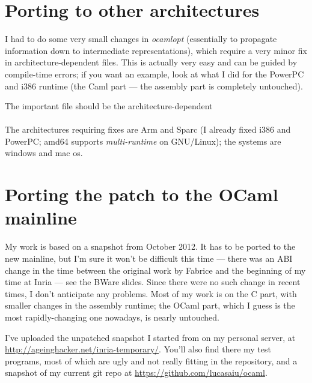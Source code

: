 \documentclass[a4paper,twoside,12pt]{article}
\newcommand{\MULTIRUNTIME}[0]{\textit{multi-runtime}\xspace}
\begin{document}
\section{Porting to other architectures}
\label{other-architectures}
I had to do some very small changes in \textit{ocamlopt} (essentially
to propagate information down to intermediate representations), which
require a very minor fix in architecture-dependent files.  This is
actually very easy and can be guided by compile-time errors; if you
want an example, look at what I did for the PowerPC and i386 runtime
(the Caml part --- the assembly part is completely untouched).

The important file should be the architecture-dependent 
\\
\\
The architectures requiring fixes are Arm and Sparc (I already fixed
i386 and PowerPC; amd64 supports \MULTIRUNTIME on GNU/Linux); the
systems are windows and mac os.

\section{Porting the patch to the OCaml mainline}
My work is based on a snapshot from October 2012.  It has to be ported
to the new mainline, but I'm sure it won't be difficult this time ---
there was an ABI change in the time between the original work by
Fabrice and the beginning of my time at Inria --- see the BWare
slides.  Since there were no such change in recent times, I don't
anticipate any problems.  Most of my work is on the C part, with
smaller changes in the assembly runtime; the OCaml part, which I guess
is the most rapidly-changing one nowadays, is nearly untouched.

\label{on-ageinghacker-net}
I've uploaded the unpatched snapshot I started from on my personal
server, at \url{http://ageinghacker.net/inria-temporary/}.  You'll
also find there my test programs, most of which are ugly and not
really fitting in the repository, and a snapshot of my current git
repo at \url{https://github.com/lucasaiu/ocaml}.

\end{document}
